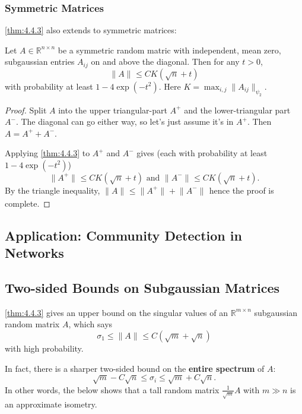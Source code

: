 \subsubsection{Symmetric Matrices}
\cref{thm:4.4.3} also extends to symmetric matrices:

\begin{corollary}[]
Let $A \in \mathbb{R}^{n \times n}$ be a symmetric random matric with independent, mean zero, subgaussian 
entries $A_{ij}$ on and above the diagonal. Then for any $t > 0$, 
\[ \lVert A \rVert_{} \leq CK (\sqrt{n} + t) \]
with probability at least $1 - 4 \exp{(-t^2)}$. Here $K = \max_{i, j} \lVert A_{ij} \rVert_{\psi_2}$.
\end{corollary}

\begin{proof}
Split $A$ into the upper triangular-part $A^+$ and the lower-triangular part $A^-$. The diagonal can go 
either way, so let's just assume it's in $A^+$. Then $A = A^+ + A^-$.

Applying \cref{thm:4.4.3} to $A^+$ and $A^-$ gives (each with probability at least $1 - 4 \exp{(-t^2)}$)
\[ \lVert A^+ \rVert_{} \leq CK(\sqrt{n} + t) \text{ and } \lVert A^- \rVert_{} \leq CK(\sqrt{n} + t). \]
By the triangle inequality, $\lVert A \rVert_{} \leq \lVert A^+ \rVert_{} + \lVert A^- \rVert_{}$ hence the 
proof is complete.
\end{proof}



\subsection{Application: Community Detection in Networks}



\subsection{Two-sided Bounds on Subgaussian Matrices}
\cref{thm:4.4.3} gives an upper bound on the singular values of an $\mathbb{R}^{m \times n}$ subgaussian 
random matrix $A$, which says 
\[ \sigma_1 \leq \lVert A \rVert_{} \leq C (\sqrt{m} + \sqrt{n}) \]
with high probability. 

In fact, there is a sharper two-sided bound on the \textbf{entire spectrum} of $A$:
\[ \sqrt{m} - C \sqrt{n} \leq \sigma_i \leq \sqrt{m} + C \sqrt{n}. \]
In other words, the below shows that a tall random matrix $\frac{1}{\sqrt{m}}A$ with $m \gg n$ is an 
approximate isometry.

